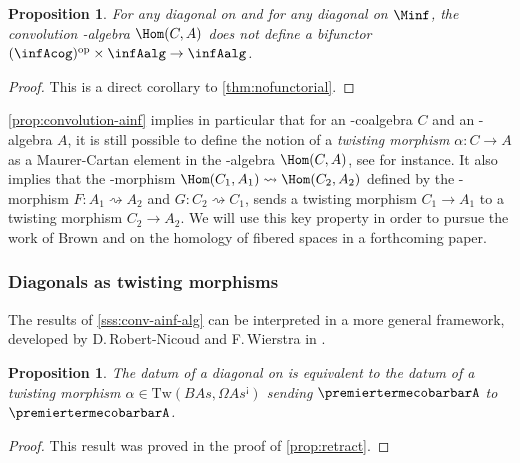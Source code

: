 \documentclass[JEP,XML,SOM,NoFloatCountersInSection,Unicode,published]{cedram}
\theoremstyle{definition}
\theoremstyle{plain}
\newtheorem{proposition}[definition]{Proposition}
\begin{document}
\begin{proposition}
\label{coroll:nobifunctor}
For any diagonal on \Ainf and for any diagonal on $\Minf$, the convolution \Ainf-algebra $\Hom(C,A)$ does not define a bifunctor $(\infAcog)^{\mathrm{op}} \times \infAalg \to \infAalg$.
\end{proposition}
\begin{proof}
This is a direct corollary to \cref{thm:nofunctorial}.
\end{proof}

\cref{prop:convolution-ainf} implies in particular that for an \Ainf -coalgebra $C$ and an \Ainf\nobreakdash-alge\-bra $A$, it is still possible to define the notion of a \textit{twisting morphism} $\alpha : C \to A$ as a Maurer-Cartan element in the \Ainf -algebra $\Hom (C,A)$, see \cite[Eq.\,(4.1), p.72]{dotsenko2018twisting} for instance.
It also implies that the \Ainf -morphism $\Hom (C_1,A_1) \rightsquigarrow \Hom (C_2,A_2)$ defined by the \Ainf -morphism $F : A_1 \rightsquigarrow A_2$ and $G : C_2 \rightsquigarrow C_1$, sends a twisting morphism $C_1 \to A_1$ to a twisting morphism $C_2 \to A_2$.
We will use this key property in order to pursue the work of Brown \cite{Brown59} and \cite{Proute86} on the homology of fibered spaces in a forthcoming paper.

\subsubsection{Diagonals as twisting morphisms}
\label{sec:RNW}

The results of \cref{sss:conv-ainf-alg} can be interpreted in a more general framework, developed by D.\,Robert-Nicoud and F.\,Wierstra in \cite{RobertNicoudWierstraI,RobertNicoudWierstraII}.

\begin{proposition}
\label{coroll:twisting}
The datum of a diagonal on \Ainf is equivalent to the datum of a twisting morphism $\alpha \in \mathrm{Tw}(B As,\Omega As^{\text{¡}})$ sending $\premiertermecobarbarA$ to $\premiertermecobarbarA$.
\end{proposition}

\begin{proof}
This result was proved in the proof of \cref{prop:retract}.
\end{proof}
\end{document}
